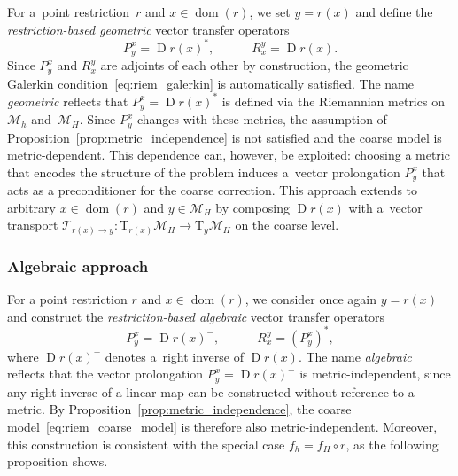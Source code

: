 \documentclass[11pt,reqno]{amsart}
\theoremstyle{plain}
\DeclareMathOperator{\Drm}{D}
\DeclareMathOperator{\dom}{dom}
\def\restr{r}
\newcommand\calT{\mathcal T}
\newcommand{\M}{\mathcal{M}}
\newcommand{\Tan}{\mathrm{T}}
\begin{document}
	For a~point restriction~$r$ and $x \in \dom(r)$, we set $y = r(x)$ and define
	the \emph{restriction-based geometric} vector transfer operators
	\[
	P_y^x = \Drm r(x)^\ast, \qquad\quad R_x^y = \Drm r(x).
	\]
	Since $P_y^x$ and $R_x^y$ are adjoints of each other by construction, the 
	geometric Galerkin condition~\eqref{eq:riem_galerkin} is automatically satisfied.
	The name \emph{geometric} reflects that $P_y^x = \Drm r(x)^\ast$ is defined 
	via the Riemannian metrics on $\M_h$ and~$\M_H$. Since $P_y^x$ changes 
	with these metrics, the assumption of Proposition~\ref{prop:metric_independence} 
	is not satisfied and the coarse model is metric-dependent. This dependence 
	can, however, be exploited: choosing a metric that encodes the structure 
	of the problem induces a~vector prolongation $P_y^x$ that acts as a preconditioner for the coarse correction. This approach extends to arbitrary $x \in \dom(r)$ and $y \in \M_H$ by composing $\Drm r(x)$ with a~vector transport 
	$\calT_{r(x)\to y}\colon \Tan_{r(x)}\M_H \to \Tan_y\M_H$ on the coarse level.
	
	\subsubsection{Algebraic approach}\label{ssec:r-alg}
	For a point restriction $r$ and $x \in \dom(r)$, we consider once again $y = r(x)$ and construct the \emph{restriction-based algebraic} vector transfer operators
	\begin{equation} \label{eq:r_algebraic_prol_restr}
		P_y^x = \Drm \restr(x)^-, \qquad\quad
		R_x^y = (P_y^x)^\ast,    
	\end{equation}
	where $\Drm \restr(x)^-$ denotes a~right inverse of $\Drm \restr(x)$.
	The name \emph{algebraic} reflects that the vector prolongation $P_y^x = \Drm r(x)^-$ is 
	metric-independent, since any right inverse of a linear map can be 
	constructed without reference to a metric. By 
	Proposition~\ref{prop:metric_independence}, the coarse model~\eqref{eq:riem_coarse_model} is therefore also metric-independent. Moreover, this construction is consistent with the special case $f_h = f_H \circ r$, as the following proposition shows.
	
\end{document}
